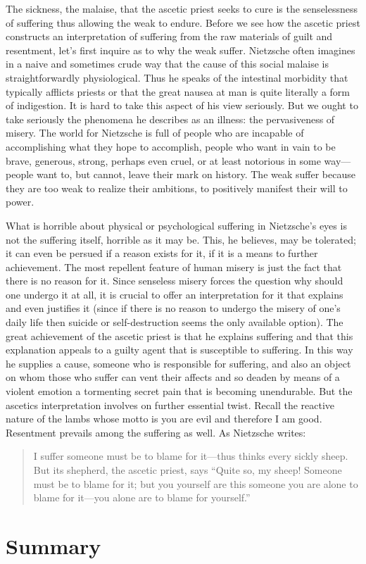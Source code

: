 The sickness, the malaise, that the ascetic priest seeks to cure is the senselessness of suffering thus allowing the weak to endure. Before we see how the ascetic priest constructs an interpretation of suffering from the raw materials of guilt and resentment, let's first inquire as to why the weak suffer. Nietzsche often imagines in a naive and sometimes crude way that the cause of this social malaise is straightforwardly physiological. Thus he speaks of the intestinal morbidity that typically afflicts priests or that the great nausea at man is quite literally a form of indigestion. It is hard to take this aspect of his view seriously. But we ought to take seriously the phenomena he describes as an illness: the pervasiveness of misery. The world for Nietzsche is full of people who are incapable of accomplishing what they hope to accomplish, people who want in vain to be brave, generous, strong, perhaps even cruel, or at least notorious in some way---people want to, but cannot, leave their mark on history. The weak suffer because they are too weak to realize their ambitions, to positively manifest their will to power.

What is horrible about physical or psychological suffering in Nietzsche's eyes is not the suffering itself, horrible as it may be. This, he believes, may be tolerated; it can even be persued if a reason exists for it, if it is a means to further achievement. The most repellent feature of human misery is just the fact that there is no reason for it. Since senseless misery forces the question why should one undergo it at all, it is crucial to offer an interpretation for it that explains and even justifies it (since if there is no reason to undergo the misery of one's daily life then suicide or self-destruction seems the only available option). The great achievement of the ascetic priest is that he explains suffering and that this explanation appeals to a guilty agent that is susceptible to suffering. In this way he supplies a cause, someone who is responsible for suffering, and also an object on whom those who suffer can vent their affects and so deaden by means of a violent emotion a tormenting secret pain that is becoming unendurable. But the ascetics interpretation involves on further essential twist. Recall the reactive nature of the lambs whose motto is you are evil and therefore I am good. Resentment prevails among the suffering as well. As Nietzsche writes:
\begin{quote}
    I suffer someone must be to blame for it---thus thinks every sickly sheep. But its shepherd, the ascetic priest, says ``Quite so, my sheep! Someone must be to blame for it; but you yourself are this someone you are alone to blame for it---you alone are to blame for yourself.''
\end{quote}

\section*{Summary}


